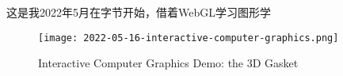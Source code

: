这是我2022年5月在字节开始，借着WebGL学习图形学 

\begin{figure}[H]
    \centering
        \texttt{[image: 2022-05-16-interactive-computer-graphics.png]}
        \caption{Interactive Computer Graphics Demo: the 3D Gasket}
    \label{fig:interactive_computer_graphics}
\end{figure}

